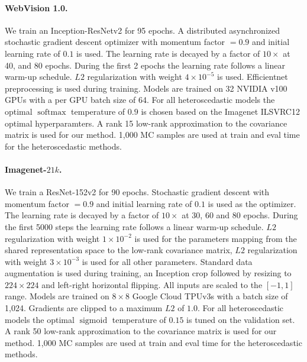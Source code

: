 \documentclass[final]{cvpr}
\DeclareMathOperator*{\softmax}{softmax}
\DeclareMathOperator*{\sigmoid}{sigmoid}
\begin{document}
\paragraph{WebVision 1.0.} We train an Inception-ResNetv2 \cite{inceptionresnet2017} for 95 epochs. A distributed asynchronized stochastic gradient descent optimizer with momentum factor $= 0.9$ and initial learning rate of $0.1$ is used. The learning rate is decayed by a factor of $10\times$ at 40, and 80 epochs. During the first 2 epochs the learning rate follows a linear warm-up schedule. $L2$ regularization with weight $4 \times 10^{-5}$ is used. Efficientnet \cite{tan2019efficientnet} preprocessing is used during training. Models are trained on 32 NVIDIA v100 GPUs with a per GPU batch size of 64. For all heteroscedastic models the optimal $\softmax$ temperature of $0.9$ is chosen based on the Imagenet ILSVRC12 optimal hyperparamters. A rank 15 low-rank approximation to the covariance matrix is used for our method. 1,000 MC samples are used at train and eval time for the heteroscedastic methods.

\paragraph{Imagenet-$21k$.} We train a ResNet-152v2 \cite{he2016deep} for 90 epochs. Stochastic gradient descent with momentum factor $= 0.9$ and initial learning rate of $0.1$ is used as the optimizer. The learning rate is decayed by a factor of $10\times$ at 30, 60 and 80 epochs. During the first 5000 steps the learning rate follows a linear warm-up schedule. $L2$ regularization with weight $1 \times 10^{-2}$ is used for the parameters mapping from the shared representation space to the low-rank covariance matrix, $L2$ regularization with weight $3 \times 10^{-3}$ is used for all other parameters. Standard data augmentation is used during training, an Inception crop followed by resizing to $224 \times 224$ and left-right horizontal flipping. All inputs are scaled to the $[-1, 1]$ range. Models are trained on $8 \times 8$ Google Cloud TPUv3s with a batch size of 1,024. Gradients are clipped to a maximum $L2$ of $1.0$. For all heteroscedastic models the optimal $\sigmoid$ temperature of $0.15$ is tuned on the validation set. A rank 50 low-rank approximation to the covariance matrix is used for our method. 1,000 MC samples are used at train and eval time for the heteroscedastic methods.
\end{document}
